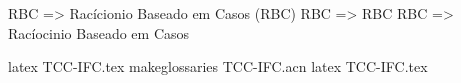 
\let\su@ExpandTwoArgs\relax 
\let\IfSubStringInString\relax 
\let\su@IfSubStringInString\relax 




\makeglossaries


\printglossary[title=Lista de Siglas, type=\acronymtype]

\acrfull{RBC} => Racícionio Baseado em Casos (RBC)  
\acrshort{RBC} => RBC
\acrlong{RBC} => Racíocinio Baseado em Casos

latex TCC-IFC.tex
makeglossaries TCC-IFC.acn
latex TCC-IFC.tex

